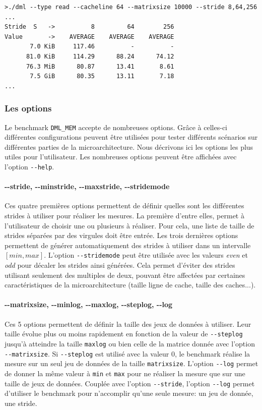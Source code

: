 \begin{verbatim}
>./dml --type read --cacheline 64 --matrixsize 10000 --stride 8,64,256
...
Stride  S   ->          8         64        256
Value       ->    AVERAGE    AVERAGE    AVERAGE
       7.0 KiB     117.46          -          -
      81.0 KiB     114.29      88.24      74.12
      76.3 MiB      80.87      13.41       8.61
       7.5 GiB      80.35      13.11       7.18
...
\end{verbatim}

  

    \subsubsection{Les options}
        Le benchmark \verb=DML_MEM= accepte de nombreuses options. Grâce à celles-ci différentes configurations peuvent être utilisées pour tester différents scénarios sur différentes parties de la microarchitecture. Nous décrivons ici les options les plus utiles pour l'utilisateur. Les nombreuses options peuvent être affichées avec l'option \verb|--help|.
        
        
        \paragraph{-{}-stride, -{}-minstride, -{}-maxstride, -{}-stridemode} Ces quatre premières options permettent de définir quelles sont les différentes strides à utiliser pour réaliser les mesures. La première d'entre elles, permet à l'utilisateur de choisir une ou plusieurs à réaliser. Pour cela, une liste de taille de strides séparées par des virgules doit être entrée. Les trois dernières options permettent de générer automatiquement des strides à utiliser dans un intervalle $[min, max]$. L'option \verb|--stridemode| peut être utilisée avec les valeurs \textit{even} et \textit{odd} pour décaler les strides ainsi générées. Cela permet d'éviter des strides utilisant seulement des multiples de deux, pouvant être affectées par certaines caractéristiques de la microarchitecture (taille ligne de cache, taille des caches...). 
        
        \paragraph{-{}-matrixsize, -{}-minlog, -{}-maxlog, -{}-steplog, -{}-log} Ces 5 options permettent de définir la taille des jeux de données à utiliser. Leur taille évolue plus ou moins rapidement en fonction de la valeur de \verb|--steplog| jusqu'à atteindre la taille \verb|maxlog| ou bien celle de la matrice donnée avec l'option \verb|--matrixsize|. Si \verb|--steplog| est utilisé avec la valeur $0$, le benchmark réalise la mesure sur un seul jeu de données de la taille \verb=matrixsize=. L'option \verb|--log| permet de donner la même valeur à \verb|min| et \verb|max| pour ne réaliser la mesure que sur une taille de jeux de données. Couplée avec l'option \verb|--stride|, l'option \verb=--log= permet d'utiliser le benchmark pour n'accomplir qu'une seule mesure: un jeu de donnée, une stride.
        
